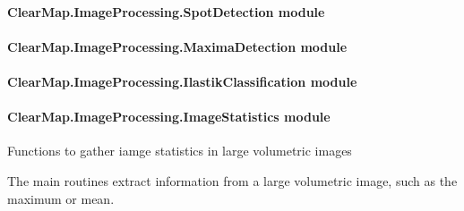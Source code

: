 \documentclass[letterpaper,10pt,english]{sphinxmanual}
\begin{document}
\paragraph{ClearMap.ImageProcessing.SpotDetection module}
\label{api/ClearMap.ImageProcessing:clearmap-imageprocessing-spotdetection-module}

\paragraph{ClearMap.ImageProcessing.MaximaDetection module}
\label{api/ClearMap.ImageProcessing:clearmap-imageprocessing-maximadetection-module}

\paragraph{ClearMap.ImageProcessing.IlastikClassification module}
\label{api/ClearMap.ImageProcessing:clearmap-imageprocessing-ilastikclassification-module}

\paragraph{ClearMap.ImageProcessing.ImageStatistics module}
\label{api/ClearMap.ImageProcessing:module-ClearMap.ImageProcessing.ImageStatistics}\label{api/ClearMap.ImageProcessing:clearmap-imageprocessing-imagestatistics-module}
Functions to gather iamge statistics in large volumetric images

The main routines extract information from a large volumetric image, such as
the maximum or mean.
\end{document}
